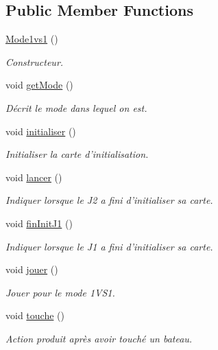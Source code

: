 \subsection*{Public Member Functions}
\begin{DoxyCompactItemize}
\item 
\hyperlink{classMode1vs1_aea3b243976c6b47ecaf1b2fd6181cd83}{Mode1vs1} ()
\begin{DoxyCompactList}\small\item\em Constructeur. \end{DoxyCompactList}\item 
void \hyperlink{classMode1vs1_a7e38b115b83c63fe95a0fd96594c6fd9}{get\+Mode} ()
\begin{DoxyCompactList}\small\item\em Décrit le mode dans lequel on est. \end{DoxyCompactList}\item 
void \hyperlink{classMode1vs1_a96b5ffac518dc015717e361248715e78}{initialiser} ()
\begin{DoxyCompactList}\small\item\em Initialiser la carte d'initialisation. \end{DoxyCompactList}\item 
void \hyperlink{classMode1vs1_a4b62821aec55d3a01257eb9cf3d4fd28}{lancer} ()
\begin{DoxyCompactList}\small\item\em Indiquer lorsque le J2 a fini d'initialiser sa carte. \end{DoxyCompactList}\item 
void \hyperlink{classMode1vs1_a21a9f0c6705700943538ce86ec252ad6}{fin\+Init\+J1} ()
\begin{DoxyCompactList}\small\item\em Indiquer lorsque le J1 a fini d'initialiser sa carte. \end{DoxyCompactList}\item 
void \hyperlink{classMode1vs1_ac79db87b0b4a3c72ebf6300ed708c40d}{jouer} ()
\begin{DoxyCompactList}\small\item\em Jouer pour le mode 1\+V\+S1. \end{DoxyCompactList}\item 
void \hyperlink{classMode1vs1_ac94642f3b6ca6b835ded37ed3e2fbf79}{touche} ()
\begin{DoxyCompactList}\small\item\em Action produit après avoir touché un bateau. \end{DoxyCompactList}\item 

\end{DoxyCompactItemize}
